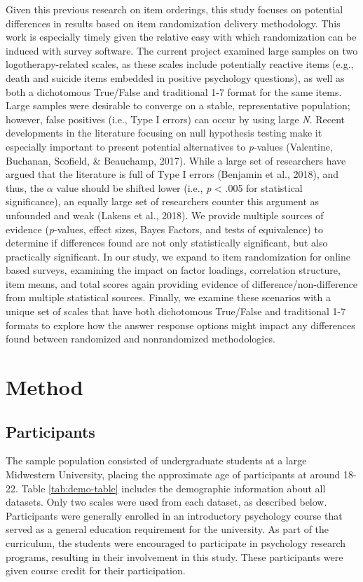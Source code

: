 \documentclass[english,man, mask]{apa6}
\theoremstyle{definition}
\theoremstyle{definition}
\theoremstyle{definition}
\theoremstyle{remark}
\begin{document}
Given this previous research on item orderings, this study focuses on
potential differences in results based on item randomization delivery
methodology. This work is especially timely given the relative easy with
which randomization can be induced with survey software. The current
project examined large samples on two logotherapy-related scales, as
these scales include potentially reactive items (e.g., death and suicide
items embedded in positive psychology questions), as well as both a
dichotomous True/False and traditional 1-7 format for the same items.
Large samples were desirable to converge on a stable, representative
population; however, false positives (i.e., Type I errors) can occur by
using large \emph{N}. Recent developments in the literature focusing on
null hypothesis testing make it especially important to present
potential alternatives to \emph{p}-values (Valentine, Buchanan,
Scofield, \& Beauchamp, 2017). While a large set of researchers have
argued that the literature is full of Type I errors (Benjamin et al.,
2018), and thus, the \(\alpha\) value should be shifted lower (i.e.,
\emph{p} \textless{} .005 for statistical significance), an equally
large set of researchers counter this argument as unfounded and weak
(Lakens et al., 2018). We provide multiple sources of evidence
(\emph{p}-values, effect sizes, Bayes Factors, and tests of equivalence)
to determine if differences found are not only statistically
significant, but also practically significant. In our study, we expand
to item randomization for online based surveys, examining the impact on
factor loadings, correlation structure, item means, and total scores
again providing evidence of difference/non-difference from multiple
statistical sources. Finally, we examine these scenarios with a unique
set of scales that have both dichotomous True/False and traditional 1-7
formats to explore how the answer response options might impact any
differences found between randomized and nonrandomized methodologies.

\section{Method}\label{method}

\subsection{Participants}\label{participants}

The sample population consisted of undergraduate students at a large
Midwestern University, placing the approximate age of participants at
around 18-22. Table \ref{tab:demo-table} includes the demographic
information about all datasets. Only two scales were used from each
dataset, as described below. Participants were generally enrolled in an
introductory psychology course that served as a general education
requirement for the university. As part of the curriculum, the students
were encouraged to participate in psychology research programs,
resulting in their involvement in this study. These participants were
given course credit for their participation.
\end{document}
